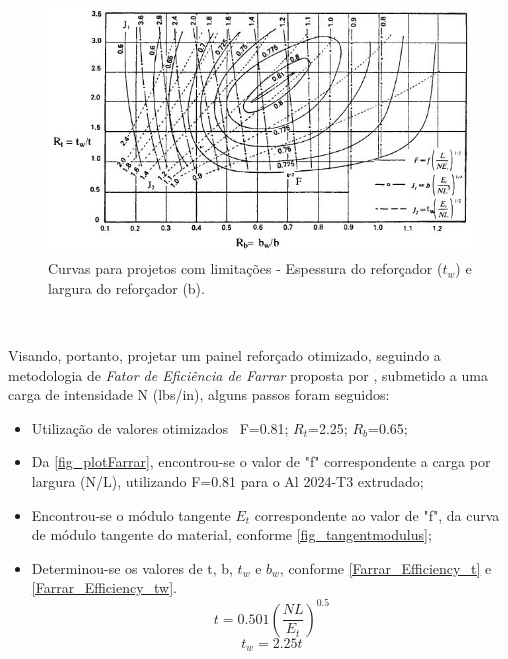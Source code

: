 {\begin{figure}[ht]
	\caption{\label{fig_plotstiffener}Curvas para projetos com limitações - Espessura do reforçador ($t_w$) e largura do reforçador (b).}
  \centering
  \includegraphics[scale=1.0]{figura/PlotStiffener}
\end{figure}
\

Visando, portanto, projetar um painel reforçado otimizado, seguindo a metodologia de \emph{Fator de Eficiência de Farrar} proposta por \cite{niu1997airframe}, submetido a uma carga de intensidade N (lbs/in), alguns passos foram seguidos:

\begin{itemize}
\item Utilização de valores otimizados \
F=0.81; $R_t$=2.25; $R_b$=0.65;\
\item Da \autoref{fig_plotFarrar}, encontrou-se o valor de "f" correspondente a carga por largura (N/L), utilizando F=0.81 para o Al 2024-T3 extrudado;
\item Encontrou-se o módulo tangente $E_t$ correspondente ao valor de "f", da curva de módulo tangente do material, conforme \autoref{fig_tangentmodulus};
\item Determinou-se os valores de t, b, $t_w$ e $b_w$, conforme \autoref{Farrar_Efficiency_t} e \autoref{Farrar_Efficiency_tw}.
\begin{equation} \label{Farrar_Efficiency_t}
t = 0.501({\dfrac{NL}{E_t}})^{0.5}
\end{equation}
\begin{equation} \label{Farrar_Efficiency_tw}
t_w = 2.25t
\end{equation}

\end{itemize}

}
